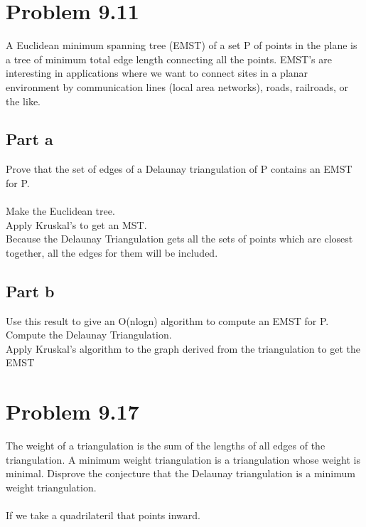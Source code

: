 \documentclass[11pt,psfig]{article}
\begin{document}
\section*{Problem 9.11}

A Euclidean minimum spanning tree (EMST) of a set P of points in the
plane is a tree of minimum total edge length connecting all the points.
EMST’s are interesting in applications where we want to connect sites
in a planar environment by communication lines (local area networks),
roads, railroads, or the like.\\

\subsection*{Part a}
Prove that the set of edges of a Delaunay triangulation of P contains
an EMST for P.\\
\\
Make the Euclidean tree. \\
Apply Kruskal's to get an MST. \\
Because the Delaunay Triangulation gets all the sets of points which are closest together, all the edges for them will be included. 

\subsection*{Part b}
Use this result to give an O(nlogn) algorithm to compute an EMST
for P.\\
Compute the Delaunay Triangulation. \\
Apply Kruskal's algorithm to the graph derived from the triangulation to get the EMST\\

\section*{Problem 9.17}

The weight of a triangulation is the sum of the lengths of all edges of
the triangulation. A minimum weight triangulation is a triangulation
whose weight is minimal. Disprove the conjecture that the Delaunay
triangulation is a minimum weight triangulation.\\
\\
If we take a quadrilateril that points inward. 

\end{document}
